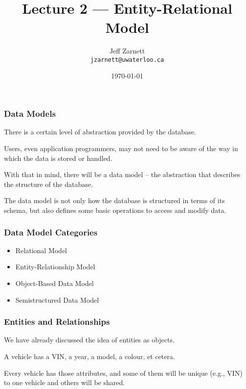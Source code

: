 

\title{Lecture  2 --- Entity-Relational Model }

\author{Jeff Zarnett \\ \small \texttt{jzarnett@uwaterloo.ca}}
\date{\today}




\begin{frame}
  \titlepage

 \end{frame}



\begin{frame}
\frametitle{Data Models}

There is a certain level of abstraction provided by the database. 

Users, even application programmers, may not need to be aware of the way in which the data is stored or handled.

 With that in mind, there will be a \alert{data model} -- the abstraction that describes the structure of the database. 
 
 The data model is not only how the database is structured in terms of its schema, but also defines some basic operations to access and modify data.


\end{frame}



\begin{frame}
\frametitle{Data Model Categories}

\begin{itemize}
	\item Relational Model
	\item Entity-Relationship Model
	\item Object-Based Data Model
	\item Semistructured Data Model
\end{itemize}

\end{frame}



\begin{frame}
\frametitle{Entities and Relationships}


We have already discussed the idea of entities as objects. 

A vehicle has a VIN, a year, a model, a colour, et cetera. 

Every vehicle has those attributes, and some of them will be unique (e.g., VIN) to one vehicle and others will be shared.

\end{frame}




